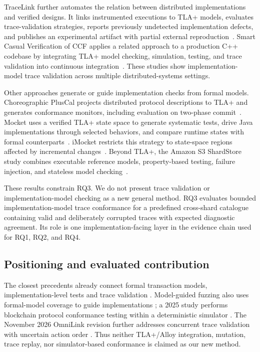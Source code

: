 TraceLink further automates the relation between distributed implementations
and verified designs. It links instrumented executions to TLA+ models,
evaluates trace-validation strategies, reports previously undetected
implementation defects, and publishes an experimental artifact with partial
external reproduction~\cite{hackett2025tracelink}. Smart Casual Verification
of CCF applies a related approach to a production C++ codebase by integrating
TLA+ model checking, simulation, testing, and trace validation into continuous
integration~\cite{howard2025ccf}. These studies show implementation-model trace
validation across multiple distributed-systems settings.

Other approaches generate or guide implementation checks from formal models.
Choreographic PlusCal projects distributed protocol descriptions to TLA+ and
generates conformance monitors, including evaluation on two-phase
commit~\cite{foo2023choreographic}. Mocket uses a verified TLA+ state space to
generate systematic tests, drive Java implementations through selected
behaviors, and compare runtime states with formal
counterparts~\cite{wang2023mocket}. iMocket restricts this strategy to
state-space regions affected by incremental changes~\cite{gao2025imocket}.
Beyond TLA+, the Amazon S3 ShardStore study combines executable reference
models, property-based testing, failure injection, and stateless model
checking~\cite{bornholt2021s3}.

These results constrain RQ3. We do not present trace validation or
implementation-model checking as a new general method. RQ3 evaluates bounded
implementation-model trace conformance for a predefined cross-shard catalogue
containing valid and deliberately corrupted traces with expected diagnostic
agreement. Its role is one implementation-facing layer in the evidence chain
used for RQ1, RQ2, and RQ4.

\subsection{Positioning and evaluated contribution}
\label{subsec:related-positioning}

The closest precedents already connect formal transaction models,
implementation-level tests and trace validation
\cite{schultz2025mongodb,cirstea2025traces,wang2023mocket,hackett2025tracelink}.
Model-guided fuzzing also uses formal-model coverage to guide implementations
\cite{gulcan2025modelfuzz}; a 2025 study performs blockchain protocol
conformance testing within a deterministic simulator
\cite{drobnjakovic2025blockchains}. The November 2026 OmniLink revision
further addresses concurrent trace validation with uncertain action order
\cite{hackett2026omnilink}. Thus neither TLA+/Alloy integration, mutation,
trace replay, nor simulator-based conformance is claimed as our new method.

